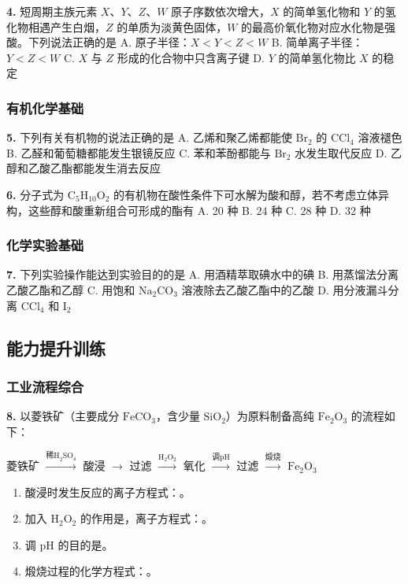 \textbf{4.} 短周期主族元素 $X$、$Y$、$Z$、$W$ 原子序数依次增大，$X$ 的简单氢化物和 $Y$ 的氢化物相遇产生白烟，$Z$ 的单质为淡黄色固体，$W$ 的最高价氧化物对应水化物是强酸。下列说法正确的是
A. 原子半径：$X < Y < Z < W$
B. 简单离子半径：$Y < Z < W$
C. $X$ 与 $Z$ 形成的化合物中只含离子键
D. $Y$ 的简单氢化物比 $X$ 的稳定

\subsubsection{有机化学基础}

\textbf{5.} 下列有关有机物的说法正确的是
A. 乙烯和聚乙烯都能使 $\text{Br}_2$ 的 $\text{CCl}_4$ 溶液褪色
B. 乙醛和葡萄糖都能发生银镜反应
C. 苯和苯酚都能与 $\text{Br}_2$ 水发生取代反应
D. 乙醇和乙酸乙酯都能发生消去反应

\textbf{6.} 分子式为 $\text{C}_5\text{H}_{10}\text{O}_2$ 的有机物在酸性条件下可水解为酸和醇，若不考虑立体异构，这些醇和酸重新组合可形成的酯有
A. 20 种 \quad B. 24 种 \quad C. 28 种 \quad D. 32 种

\subsubsection{化学实验基础}

\textbf{7.} 下列实验操作能达到实验目的的是
A. 用酒精萃取碘水中的碘
B. 用蒸馏法分离乙酸乙酯和乙醇
C. 用饱和 $\text{Na}_2\text{CO}_3$ 溶液除去乙酸乙酯中的乙酸
D. 用分液漏斗分离 $\text{CCl}_4$ 和 $\text{I}_2$

\subsection{能力提升训练}

\subsubsection{工业流程综合}

\textbf{8.} 以菱铁矿（主要成分 $\text{FeCO}_3$，含少量 $\text{SiO}_2$）为原料制备高纯 $\text{Fe}_2\text{O}_3$ 的流程如下：

菱铁矿 $\xrightarrow{\text{稀H}_2\text{SO}_4}$ 酸浸 $\to$ 过滤 $\xrightarrow{\text{H}_2\text{O}_2}$ 氧化 $\xrightarrow{\text{调pH}}$ 过滤 $\xrightarrow{\text{煅烧}}$ $\text{Fe}_2\text{O}_3$

\begin{enumerate}
  \item 酸浸时发生反应的离子方程式：\underline{\qquad\qquad}。
  \item 加入 $\text{H}_2\text{O}_2$ 的作用是\underline{\qquad\qquad}，离子方程式：\underline{\qquad\qquad}。
  \item 调 pH 的目的是\underline{\qquad\qquad}。
  \item 煅烧过程的化学方程式：\underline{\qquad\qquad}。
\end{enumerate}

